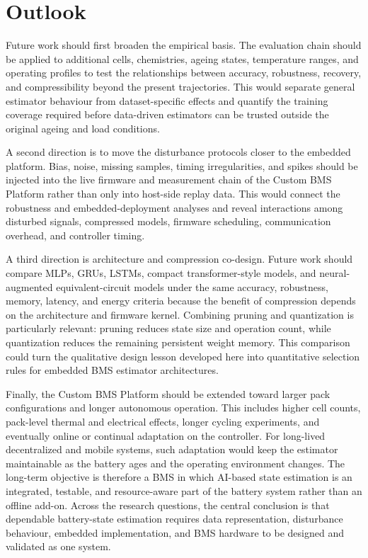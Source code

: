 \documentclass[
    a4paper,
    12pt,
    titlepage,
    bibliography=totoc,
    twoside=on,
    parskip=false,
    numbers=noenddot,
    cleardoublepage=empty,
    DIV=12,
    BCOR=12.0mm,
    headheight=36pt,
    headings=openright
]{scrreprt}
\begin{document}
\section{Outlook}
Future work should first broaden the empirical basis. The evaluation chain should be applied to additional cells, chemistries, ageing states, temperature ranges, and operating profiles to test the relationships between accuracy, robustness, recovery, and compressibility beyond the present trajectories. This would separate general estimator behaviour from dataset-specific effects and quantify the training coverage required before data-driven estimators can be trusted outside the original ageing and load conditions.

A second direction is to move the disturbance protocols closer to the embedded platform. Bias, noise, missing samples, timing irregularities, and spikes should be injected into the live firmware and measurement chain of the Custom BMS Platform rather than only into host-side replay data. This would connect the robustness and embedded-deployment analyses and reveal interactions among disturbed signals, compressed models, firmware scheduling, communication overhead, and controller timing.

A third direction is architecture and compression co-design. Future work should compare MLPs, GRUs, LSTMs, compact transformer-style models, and neural-augmented equivalent-circuit models under the same accuracy, robustness, memory, latency, and energy criteria because the benefit of compression depends on the architecture and firmware kernel. Combining pruning and quantization is particularly relevant: pruning reduces state size and operation count, while quantization reduces the remaining persistent weight memory. This comparison could turn the qualitative design lesson developed here into quantitative selection rules for embedded BMS estimator architectures.

Finally, the Custom BMS Platform should be extended toward larger pack configurations and longer autonomous operation. This includes higher cell counts, pack-level thermal and electrical effects, longer cycling experiments, and eventually online or continual adaptation on the controller. For long-lived decentralized and mobile systems, such adaptation would keep the estimator maintainable as the battery ages and the operating environment changes. The long-term objective is therefore a BMS in which AI-based state estimation is an integrated, testable, and resource-aware part of the battery system rather than an offline add-on. Across the research questions, the central conclusion is that dependable battery-state estimation requires data representation, disturbance behaviour, embedded implementation, and BMS hardware to be designed and validated as one system.
\end{document}
